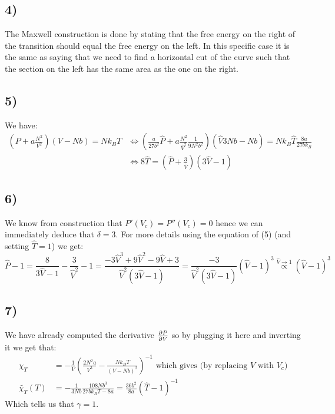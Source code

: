 \documentclass[10pt,a4paper]{book}
\begin{document}
\subsection*{4)} The Maxwell construction is done by stating that the free energy on the right of the transition should equal the free energy on the left. In this specific case it is the same as saying that we need to find a horizontal cut of the curve such that the section on the left has the same area as the one on the right.

\subsection*{5)}
We have:
\begin{align*}
(P + a\frac{N^2}{V^2}) (V - N b) = N k_B T &\Leftrightarrow ( \frac{a}{27 b^2} \hat{P} + a\frac{N^2}{\hat{V}^2}\frac{1}{9 N^2 b^2}) (\hat{V} 3 N b - N b) = N k_B \hat{T} \frac{8 a}{27 b k_B}\\
&\Leftrightarrow 8 \hat{T} = (\hat{P} + \frac{3}{\hat{V}})(3\hat{V} - 1)
\end{align*}

\subsection*{6)}
We know from construction that $P'(V_c) = P''(V_c) = 0$ hence we can immediately deduce that $\delta = 3$. For more details using the equation of (5) (and setting $\hat{T} = 1$) we get:
\[
\hat{P} - 1 = \frac{8}{3 \hat{V} - 1} - \frac{3}{\hat{V}^2} - 1 = \frac{-3 \hat{V}^3 + 9 \hat{V}^2 - 9 \hat{V} + 3}{\hat{V}^2(3 \hat{V} - 1)} = \frac{-3}{\hat{V}^2(3 \hat{V} - 1)} (\hat{V} - 1)^3 \stackrel{\hat{V} \to 1}{\propto} (\hat{V} - 1)^3
\]

\subsection*{7)}
We have already computed the derivative $\pdv{P}{V}$ so by plugging it here and inverting it we get that:
\begin{align*}
\chi_T &= -\frac{1}{V}\left(\frac{2 N^2 a}{V^3} - \frac{N k_B T}{(V - N b)^2}\right)^{-1} \text{ which gives (by replacing } V \text{ with } V_c \text{)}\\
\tilde{\chi_T}(T) &= -\frac{1}{3 N b}\frac{108 N b^3}{27 b k_B T - 8 a} = \frac{36 b^2}{8 a} (\hat{T} - 1)^{-1}
\end{align*}
Which tells us that $\gamma = 1$.
\end{document}
